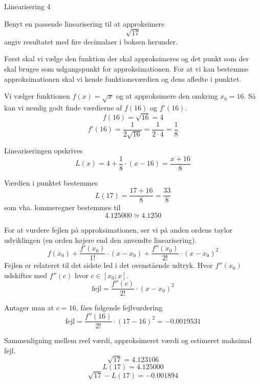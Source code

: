 \documentclass{article}
\begin{document}
\begin{exercise}{Linearisering 4}
	
	Benyt en passende linearisering til at approksimere
	\[
	\sqrt{17}
	\]
	angiv resultatet med fire decimalaer i boksen herunder.
	
	\hint
	Først skal vi vælge den funktion der skal approksimeres
	og det punkt som der skal bruges som udgangspunkt for 
	approksimationen.
	For at vi kan bestemme approksimationen skal vi 
	kende funktionsværdien og dens afledte i punktet.
	
	\hint
	Vi vælger funktionen $f(x) = \sqrt{x}$ og at approksimere den 
	omkring $x_0 = 16$.
	Så kan vi nemlig godt finde værdierne af $f(16)$ og $f'(16)$.
	\[
	f(16) = \sqrt{16} = 4
	\]
	\[
	f'(16) = \frac{1}{2 \sqrt{16}} = \frac{1}{2 \cdot 4 } = \frac{1}{8}
	\]
	
	\hint
	Lineariseringen opskrives
	\[
	L(x) = 4 + \frac{1}{8} \cdot (x - 16) = \frac{x + 16}{8}
	\]
	
	\hint
	Værdien i punktet bestemmes
	\[
	L(17) = \frac{17 + 16}{8} = \frac{33}{8}
	\]
	som vha. lommeregner bestemmes til 
	\[
	4.125000 \simeq 4.1250
	\]
	
	\hint
	For at vurdere fejlen på approksimationen, ser vi på anden 
	ordens taylor udviklingen (en orden højere end den 
	anvendte linearisering).
	\[
	f(x_0) 
	+ \frac{f'(x_0)}{1!} \cdot (x - x_0) 
	+ \frac{f''(x_0)}{2!} \cdot (x - x_0)^2
	\]
	Fejlen er relateret til det sidste led i det ovenstående udtryk.
	Hvor $f''(x_0)$ udskiftes med $f''(c)$ hvor $c \in [x_0; x]$.
	\[
	\textrm{fejl} = \frac{f''(c)}{2!} \cdot (x - x_0)^2
	\]
	
	\hint 
	Antager man at $c = 16$, fåes følgende fejlvurdering
	\[
	\textrm{fejl} = \frac{f''(16)}{2!} \cdot (17 - 16)^2 = 
	-0.0019531\]
	
	\hint
	Sammenligning mellem reel værdi, approksimeret værdi og estimeret maksimal fejl.
	\[
	\sqrt{17}= 4.123106
	\]
	\[
	L(17) = 4.125000
	\]
	\[
	\sqrt{17} - L(17)  = -0.001894
	\]
	
\end{exercise}
\end{document}
